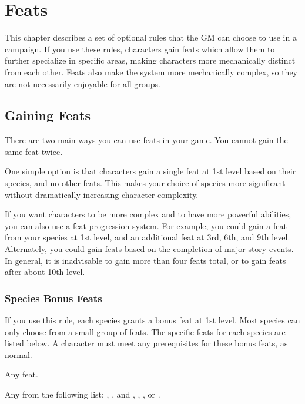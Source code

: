 \chapter{Feats}\label{Feats}

This chapter describes a set of optional rules that the GM can choose to use in a campaign.
If you use these rules, characters gain feats which allow them to further specialize in specific areas, making characters more mechanically distinct from each other.
Feats also make the system more mechanically complex, so they are not necessarily enjoyable for all groups.

\section{Gaining Feats}
    There are two main ways you can use feats in your game.
    You cannot gain the same feat twice.

    One simple option is that characters gain a single feat at 1st level based on their species, and no other feats.
    This makes your choice of species more significant without dramatically increasing character complexity.

    If you want characters to be more complex and to have more powerful abilities, you can also use a feat progression system.
    For example, you could gain a feat from your species at 1st level, and an additional feat at 3rd, 6th, and 9th level.
    Alternately, you could gain feats based on the completion of major story events.
    In general, it is inadvisable to gain more than four feats total, or to gain feats after about 10th level.

    \subsection{Species Bonus Feats}\label{Species Bonus Feats}
        If you use this rule, each species grants a bonus feat at 1st level.
        Most species can only choose from a small group of feats.
        The specific feats for each species are listed below.
        A character must meet any prerequisites for these bonus feats, as normal.

         Any feat.

         Any from the following list: , ,  and , , , or .

